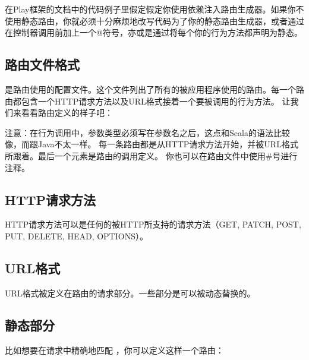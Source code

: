 \documentclass[letterpaper,10pt,english]{sphinxmanual}
\begin{document}
\begin{sphinxVerbatim}[commandchars=\\\{\}]
  
\end{sphinxVerbatim}

在Play框架的文档中的代码例子里假定假定你使用依赖注入路由生成器。如果你不使用静态路由，你就必须十分麻烦地改写代码为了你的静态路由生成器，或者通过在控制器调用前加上一个@符号，亦或是通过将每个你的行为方法都声明为静态。


\subsection{路由文件格式}
\label{\detokenize{index:id19}}
 是路由使用的配置文件。这个文件列出了所有的被应用程序使用的路由。每一个路由都包含一个HTTP请求方法以及URL格式接着一个要被调用的行为方法。
让我们来看看路由定义的样子吧：

\begin{sphinxVerbatim}[commandchars=\\\{\}]
              
\end{sphinxVerbatim}

注意：在行为调用中，参数类型必须写在参数名之后，这点和Scala的语法比较像，而跟Java不太一样。
每一条路由都是从HTTP请求方法开始，并被URL格式所跟着。最后一个元素是路由的调用定义。
你也可以在路由文件中使用\#号进行注释。


\subsection{HTTP请求方法}
\label{\detokenize{index:id20}}
HTTP请求方法可以是任何的被HTTP所支持的请求方法（GET, PATCH, POST, PUT, DELETE, HEAD, OPTIONS）。


\subsection{URL格式}
\label{\detokenize{index:url}}
URL格式被定义在路由的请求部分。一些部分是可以被动态替换的。


\subsection{静态部分}
\label{\detokenize{index:id21}}
比如想要在请求中精确地匹配  ，你可以定义这样一个路由：
\end{document}
